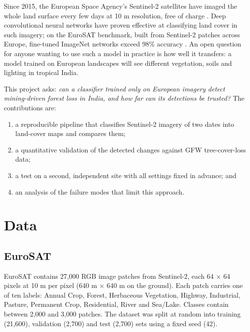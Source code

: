 \documentclass[11pt]{article}
\begin{document}
Since 2015, the European Space Agency's Sentinel-2 satellites have imaged the whole land surface every few days at 10 m resolution, free of charge \citep{drusch2012}. Deep convolutional neural networks have proven effective at classifying land cover in such imagery; on the EuroSAT benchmark, built from Sentinel-2 patches across Europe, fine-tuned ImageNet networks exceed 98\% accuracy \citep{helber2019}. An open question for anyone wanting to use such a model in practice is how well it transfers: a model trained on European landscapes will see different vegetation, soils and lighting in tropical India.

This project asks: \emph{can a classifier trained only on European imagery detect mining-driven forest loss in India, and how far can its detections be trusted?} The contributions are:
\begin{enumerate}
    \item a reproducible pipeline that classifies Sentinel-2 imagery of two dates into land-cover maps and compares them;
    \item a quantitative validation of the detected changes against GFW tree-cover-loss data;
    \item a test on a second, independent site with all settings fixed in advance; and
    \item an analysis of the failure modes that limit this approach.
\end{enumerate}

\section{Data}

\subsection{EuroSAT}
EuroSAT \citep{helber2019} contains 27,000 RGB image patches from Sentinel-2, each 64 $\times$ 64 pixels at 10 m per pixel (640 m $\times$ 640 m on the ground). Each patch carries one of ten labels: Annual Crop, Forest, Herbaceous Vegetation, Highway, Industrial, Pasture, Permanent Crop, Residential, River and Sea/Lake. Classes contain between 2,000 and 3,000 patches. The dataset was split at random into training (21,600), validation (2,700) and test (2,700) sets using a fixed seed (42).
\end{document}
